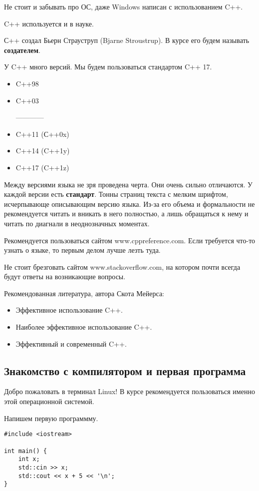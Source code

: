 Не стоит и забывать про ОС, даже Windows написан с использованием C++.

C++ используется и в науке.


С++ создал Бьерн Страуструп (Bjarne Stroustrup).
В курсе его будем называть \textbf{создателем}.

У C++ много версий. Мы будем пользоваться стандартом C++ 17.

\begin{itemize}
    \item C++98
    \item C++03

    ------------

    \item C++11 (С++0x)
    \item C++14 (C++1y)
    \item C++17 (C++1z)
\end{itemize}

Между версиями языка не зря проведена черта. Они очень сильно отличаются.
У каждой версии есть \textbf{стандарт}. Тонны страниц текста с мелким шрифтом, исчерпывающе описывающим версию языка.
Из-за его объема и формальности не рекомендуется читать и вникать в него полностью, а лишь обращаться к нему и читать по диагнали в неоднозначных моментах.

Рекомендуется пользоваться сайтом www.cppreference.com.
Если требуется что-то узнать о языке, то первым делом лучше лезть туда.

Не стоит брезговать сайтом www.stackoverflow.com, на котором почти всегда будут ответы на возникающие вопросы.

Рекомендованная литература, автора Скота Мейерса:
\begin{itemize}
    \item Эффективное использование C++.
    \item Наиболее эффективное использование C++.
    \item Эффективный и современный C++.
\end{itemize}

\subsection{Знакомство с компилятором и первая программа}
Добро пожаловать в терминал Linux!
В курсе рекомендуется пользоваться именно этой операционной системой.

Напишем первую программму.

\begin{verbatim}
#include <iostream>

int main() {
    int x;
    std::cin >> x;
    std::cout << x + 5 << '\n';
}
\end{verbatim}


